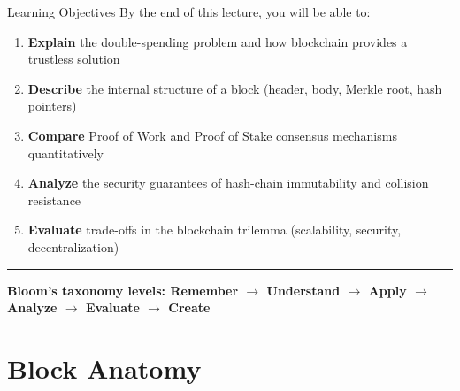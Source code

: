 \documentclass[8pt,aspectratio=169]{beamer}
\newcommand{\bottomnote}[1]{\vfill\vspace{-2mm}\textcolor{mllavender2}{\rule{\textwidth}{0.4pt}}\vspace{1mm}\footnotesize\textbf{#1}}
\begin{document}
\begin{frame}{Learning Objectives}
By the end of this lecture, you will be able to:
\begin{enumerate}
\item \textbf{Explain} the double-spending problem and how blockchain provides a trustless solution
\item \textbf{Describe} the internal structure of a block (header, body, Merkle root, hash pointers)
\item \textbf{Compare} Proof of Work and Proof of Stake consensus mechanisms quantitatively
\item \textbf{Analyze} the security guarantees of hash-chain immutability and collision resistance
\item \textbf{Evaluate} trade-offs in the blockchain trilemma (scalability, security, decentralization)
\end{enumerate}
\bottomnote{Bloom's taxonomy levels: Remember $\rightarrow$ Understand $\rightarrow$ Apply $\rightarrow$ Analyze $\rightarrow$ Evaluate $\rightarrow$ Create}
\end{frame}

\section{Block Anatomy}
\end{document}
